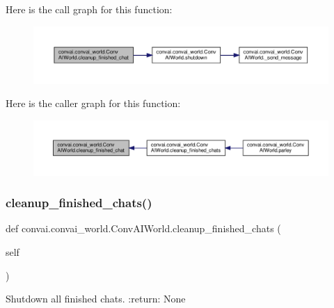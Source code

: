 Here is the call graph for this function\+:
\nopagebreak
\begin{figure}[H]
\begin{center}
\leavevmode
\includegraphics[width=350pt]{classconvai_1_1convai__world_1_1ConvAIWorld_adbed66ef531f264abbee71de82ed38b8_cgraph}
\end{center}
\end{figure}
Here is the caller graph for this function\+:
\nopagebreak
\begin{figure}[H]
\begin{center}
\leavevmode
\includegraphics[width=350pt]{classconvai_1_1convai__world_1_1ConvAIWorld_adbed66ef531f264abbee71de82ed38b8_icgraph}
\end{center}
\end{figure}
\mbox{\label{classconvai_1_1convai__world_1_1ConvAIWorld_a6263e23aeeed1da1714dfb48f61ab09d}} 
\subsubsection{\texorpdfstring{cleanup\+\_\+finished\+\_\+chats()}{cleanup\_finished\_chats()}}
{\footnotesize\ttfamily def convai.\+convai\+\_\+world.\+Conv\+A\+I\+World.\+cleanup\+\_\+finished\+\_\+chats (\begin{DoxyParamCaption}\item[{}]{self }\end{DoxyParamCaption})}

\begin{DoxyVerb}Shutdown all finished chats.
:return: None
\end{DoxyVerb}
 

